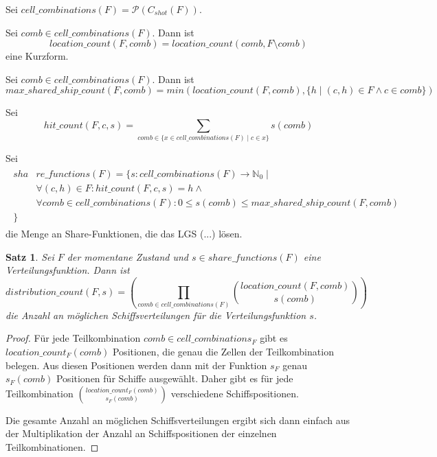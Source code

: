 \documentclass[a4paper,12pt]{llncs}
\newcommand{\N}{{\mathbb{N}}}
\numberwithin{equation}{section}
\newtheorem{satz}{Satz}
\begin{document}
\begin{definition}
Sei $cell\_combinations(F)=\mathcal{P}(C_{shot}(F))$.
\end{definition}

\begin{definition}
Sei $comb \in cell\_combinations(F)$. Dann ist
\[
location\_count(F,comb)=location\_count(comb, F \setminus comb)
\]
eine Kurzform.
\end{definition}

\begin{definition}
Sei $comb \in cell\_combinations(F)$. Dann ist
\[
max\_shared\_ship\_count(F,comb)=min(location\_count(F, comb), \{h \mid (c,h) \in F \wedge c \in comb\})
\]
\end{definition}

\begin{definition}
Sei
\[
hit\_count(F, c, s)=\sum_{comb \in \{x \in cell\_combinations(F) \mid c \in x\}}{s(comb)}
\]
\end{definition}

\begin{definition}
Sei
\begin{align}
\begin{split}
sha&re\_functions(F)=\{s \colon cell\_combinations(F) \rightarrow \N_0 \mid\\
&\forall{(c,h) \in F}\colon hit\_count(F, c, s)=h \wedge \\
&\forall{comb \in cell\_combinations(F)} \colon 0 \leq s(comb) \leq max\_shared\_ship\_count(F, comb)\\
\}\;\;\;& \nonumber
\end{split}
\end{align}
die Menge an Share-Funktionen, die das LGS (...) lösen.
\end{definition}

\begin{satz}
Sei $F$ der momentane Zustand und $s \in share\_functions(F)$ eine Verteilungsfunktion.
Dann ist
\[
distribution\_count(F, s)=
\left( \prod_{comb \in cell\_combinations(F)}{{location\_count(F, comb)\choose s(comb)}} \right)
\]
die Anzahl an möglichen Schiffsverteilungen für die Verteilungsfunktion $s$.
\end{satz}

\begin{proof}
Für jede Teilkombination $comb \in cell\_combinations_F$ gibt es $location\_count_F(comb)$ Positionen, die genau die Zellen der Teilkombination belegen. Aus diesen Positionen werden dann mit der Funktion $s_F$ genau $s_F(comb)$ Positionen für Schiffe ausgewählt. Daher gibt es für jede Teilkombination ${location\_count_F(comb)\choose s_F(comb)}$ verschiedene Schiffspositionen.

Die gesamte Anzahl an möglichen Schiffsverteilungen ergibt sich dann einfach aus der Multiplikation der Anzahl an Schiffspositionen der einzelnen Teilkombinationen.
\end{proof}
\end{document}
